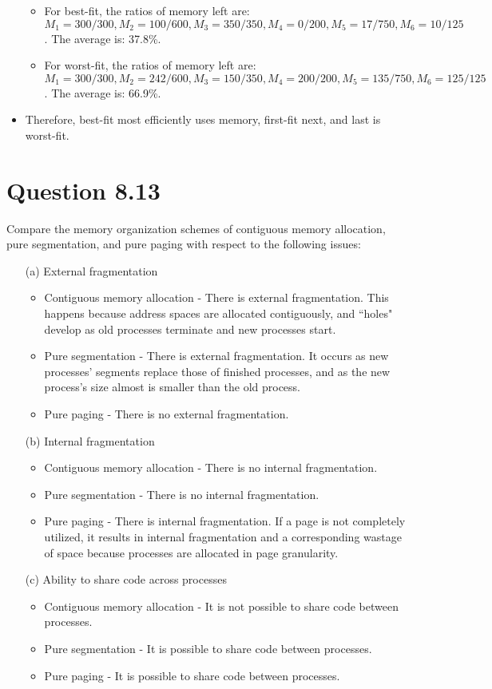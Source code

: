 \documentclass[12pt]{article}
\begin{document}
\begin{itemize}
\begin{itemize}
\item For best-fit, the ratios of memory left are: $M_{1} = 300/300, M_{2} = 100/600, M_{3} = 350/350, M_{4} = 0/200, M_{5} = 17/750, M_{6} = 10/125$. The average is: 37.8\%.
\item For worst-fit, the ratios of memory left are: $M_{1} = 300/300, M_{2} = 242/600, M_{3} = 150/350, M_{4} = 200/200, M_{5} = 135/750, M_{6} = 125/125$. The average is: 66.9\%.
\end{itemize}
\item Therefore, best-fit most efficiently uses memory, first-fit next, and last is worst-fit.
\end{itemize}

\section*{Question 8.13}{\color{blue}Compare the memory organization schemes of contiguous memory allocation, pure segmentation, and pure paging with respect to the following issues:
\begin{enumerate}
\item[(a)]External fragmentation {\color{black}
\begin{itemize}
\item Contiguous memory allocation - There is external fragmentation. This happens because address spaces are allocated contiguously, and ``holes" develop as old processes terminate and new processes start.
\item Pure segmentation - There is external fragmentation. It occurs as new processes' segments replace those of finished processes, and as the new process's size almost is smaller than the old process.
\item Pure paging - There is no external fragmentation.
\end{itemize}
}
\item[(b)]Internal fragmentation {\color{black}
\begin{itemize}
\item Contiguous memory allocation - There is no internal fragmentation.
\item Pure segmentation - There is no internal fragmentation.
\item Pure paging - There is internal fragmentation. If a page is not completely utilized, it results in internal fragmentation and a corresponding wastage of space because processes are allocated in page granularity.
\end{itemize}
}
\item[(c)]Ability to share code across processes {\color{black}
\begin{itemize}
\item Contiguous memory allocation - It is not possible to share code between processes.
\item Pure segmentation - It is possible to share code between processes.
\item Pure paging - It is possible to share code between processes.
\end{itemize}
}
\end{enumerate}
}
\end{document}
